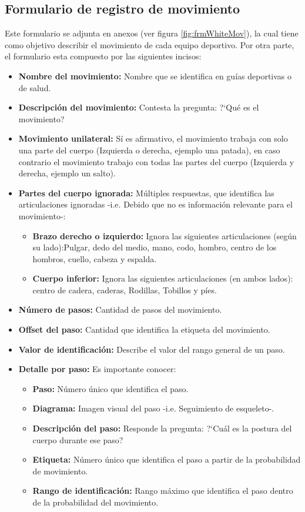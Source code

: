 \subsection{Formulario de registro de movimiento} \label{ins:frmMov}
Este formulario se adjunta en anexos (ver figura \ref{fig:frmWhiteMov}), la cual tiene como objetivo describir el movimiento de cada equipo deportivo. Por otra parte, el formulario esta compuesto por las siguientes incisos:
\begin{itemize}
	\item \textbf{Nombre del movimiento:} Nombre que se identifica en gu\'ias deportivas o de salud.
	\item \textbf{Descripci\'on del movimiento: } Contesta la pregunta: ?`Qu\'e es el movimiento?
	\item \textbf{Movimiento unilateral:} S\'i es afirmativo, el movimiento trabaja con solo una parte del cuerpo (Izquierda o derecha, ejemplo una patada), en caso contrario el movimiento trabajo con todas las partes del cuerpo (Izquierda y derecha, ejemplo un salto).
	\item \textbf{Partes del cuerpo ignorada:} M\'ultiples respuestas, que identifica las articulaciones ignoradas -i.e. Debido que no es informaci\'on relevante para el movimiento-:
	\begin{itemize}
		\item \textbf{Brazo derecho o izquierdo:} Ignora las siguientes articulaciones (seg\'un su lado):Pulgar, dedo del medio, mano, codo, hombro, centro de los hombros, cuello, cabeza y espalda.
		\item \textbf{Cuerpo inferior:} Ignora las siguientes articulaciones (en ambos lados): centro de cadera, caderas, Rodillas, Tobillos y p\'ies.
	\end{itemize}
		\item \textbf{N\'umero de pasos:} Cantidad de pasos del movimiento.
		\item \textbf{Offset del paso:} Cantidad que identifica la etiqueta del movimiento.
		\item \textbf{Valor de identificaci\'on:} Describe el valor del rango general de un paso.
		\item \textbf{Detalle por paso:} Es  importante conocer:
			\begin{itemize}
		\item \textbf{Paso:} N\'umero \'unico que identifica el paso.
		\item \textbf{Diagrama:} Imagen visual del paso -i.e. Seguimiento de esqueleto-.
		\item \textbf{Descripci\'on del paso:} Responde la pregunta: ?`Cu\'al es la postura del cuerpo durante ese paso?
		\item \textbf{Etiqueta:} N\'umero \'unico que identifica el paso a partir de la probabilidad de movimiento.
	\item \textbf{Rango de identificaci\'on:} Rango m\'aximo que identifica el paso dentro de la probabilidad del movimiento.
	\end{itemize}
\end{itemize}
